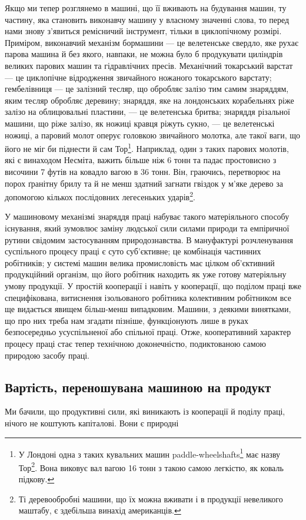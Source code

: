 
Якщо ми тепер розглянемо в машині, що її вживають на будування
машин, ту частину, яка становить виконавчу машину у
власному значенні слова, то перед нами знову з’явиться ремісничий
інструмент, тільки в циклопічному розмірі. Приміром, виконавчий
механізм бормашини — це велетенське свердло, яке рухає
парова машина й без якого, навпаки, не можна було б продукувати
циліндрів великих парових машин та гідравлічних пресів.
Механічний токарський варстат — це циклопічне відродження
звичайного ножаного токарського варстату; гембелівниця — це
залізний тесляр, що обробляє залізо тим самим знаряддям, яким
тесляр обробляє деревину; знаряддя, яке на лондонських корабельнях
ріже залізо на облицювальні пластини, — це велетенська
бритва; знаряддя різальної машини, що ріже залізо, як ножиці
кравця ріжуть сукно, — це велетенські ножиці, а паровий молот
оперує головкою звичайного молотка, але такої ваги, що його
не міг би піднести й сам Тор\footnote{
У Лондоні одна з таких кувальних машин paddle-wheelshafts\footnote*{
валів до лопатевих коліс. 
}
має назву Тор\footnote*{
Ім’я скандінавського бога блискавки, що його уявляли з великим
молотом у руці. 
}. Вона виковує вал вагою 16 тонн з такою самою легкістю,
як коваль підкову.
}. Наприклад, один з таких парових
молотів, які є винаходом Несміта, важить більше ніж 6 тонн
та падає простовисно з височини 7 футів на ковадло вагою в
36 тонн. Він, граючись, перетворює на порох ґранітну брилу та
й не менш здатний загнати гвіздок у м’яке дерево за допомогою
кількох послідовних легесеньких ударів\footnote{
Ті деревообробні машини, що їх можна вживати і в продукції
невеликого маштабу, є здебільша винахід американців.
}.

У машиновому механізмі знаряддя праці набуває такого матеріяльного
способу існування, який зумовлює заміну людської
сили силами природи та емпіричної рутини свідомим застосуванням
природознавства. В мануфактурі розчленування суспільного
процесу праці є суто суб’єктивне; це комбінація частинних робітників;
у системі машин велика промисловість має цілком об’єктивний
продукційний організм, що його робітник находить як
уже готову матеріяльну умову продукції. У простій кооперації і
навіть у кооперації, що поділом праці вже специфікована, витиснення
ізольованого робітника колективним робітником все ще
видається явищем більш-менш випадковим. Машини, з деякими
винятками, що про них треба нам згадати пізніше, функціонують
лише в руках безпосередньо усуспільненої або спільної праці.
Отже, кооперативний характер процесу праці стає тепер технічною
доконечністю, подиктованою самою природою засобу праці.

\subsection{Вартість, переношувана машиною на продукт}

Ми бачили, що продуктивні сили, які виникають із кооперації
й поділу праці, нічого не коштують капіталові. Вони є природні
\parbreak{}  %
